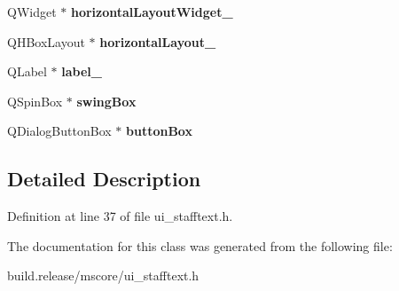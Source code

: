 \begin{DoxyCompactItemize}
Q\+Widget $\ast$ {\bfseries horizontal\+Layout\+Widget\+\_}
\item 
\mbox{\label{class_ui___staff_text_properties_a7f4433e29eec9d4a2c202d0d3f5b1f5c}} 
Q\+H\+Box\+Layout $\ast$ {\bfseries horizontal\+Layout\+\_}
\item 
\mbox{\label{class_ui___staff_text_properties_a9aef3eb2afd000c7e1d13af804e06e24}} 
Q\+Label $\ast$ {\bfseries label\+\_}
\item 
\mbox{\label{class_ui___staff_text_properties_a639f57a632c98cf3d60c17fd7278e821}} 
Q\+Spin\+Box $\ast$ {\bfseries swing\+Box}
\item 
\mbox{\label{class_ui___staff_text_properties_a39dc208be8a89652667d46a17e673a05}} 
Q\+Dialog\+Button\+Box $\ast$ {\bfseries button\+Box}
\end{DoxyCompactItemize}


\subsection{Detailed Description}


Definition at line 37 of file ui\+\_\+stafftext.\+h.



The documentation for this class was generated from the following file\+:\begin{DoxyCompactItemize}
\item 
build.\+release/mscore/ui\+\_\+stafftext.\+h\end{DoxyCompactItemize}
